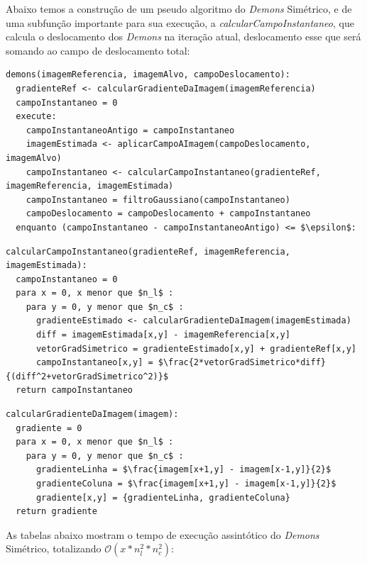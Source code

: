   Abaixo temos a construção de um pseudo algoritmo do \textit{Demons} Simétrico, e de uma subfunção importante para sua
execução, a \textit{calcularCampoInstantaneo}, que calcula o deslocamento dos \textit{Demons} na iteração atual,
deslocamento esse que será somando ao campo de deslocamento total:

\begin{lstlisting}[mathescape]
demons(imagemReferencia, imagemAlvo, campoDeslocamento):
  gradienteRef <- calcularGradienteDaImagem(imagemReferencia)
  campoInstantaneo = 0
  execute:
    campoInstantaneoAntigo = campoInstantaneo
    imagemEstimada <- aplicarCampoAImagem(campoDeslocamento, imagemAlvo)
    campoInstantaneo <- calcularCampoInstantaneo(gradienteRef, imagemReferencia, imagemEstimada)
    campoInstantaneo = filtroGaussiano(campoInstantaneo)
    campoDeslocamento = campoDeslocamento + campoInstantaneo
  enquanto (campoInstantaneo - campoInstantaneoAntigo) <= $\epsilon$:
\end{lstlisting}

\begin{lstlisting}[mathescape]
calcularCampoInstantaneo(gradienteRef, imagemReferencia, imagemEstimada):
  campoInstantaneo = 0
  para x = 0, x menor que $n_l$ :
    para y = 0, y menor que $n_c$ :
      gradienteEstimado <- calcularGradienteDaImagem(imagemEstimada)
      diff = imagemEstimada[x,y] - imagemReferencia[x,y]
      vetorGradSimetrico = gradienteEstimado[x,y] + gradienteRef[x,y]
      campoInstantaneo[x,y] = $\frac{2*vetorGradSimetrico*diff}{(diff^2+vetorGradSimetrico^2)}$
  return campoInstantaneo
\end{lstlisting}

\begin{lstlisting}[mathescape]
calcularGradienteDaImagem(imagem):
  gradiente = 0
  para x = 0, x menor que $n_l$ :
    para y = 0, y menor que $n_c$ :
      gradienteLinha = $\frac{imagem[x+1,y] - imagem[x-1,y]}{2}$
      gradienteColuna = $\frac{imagem[x+1,y] - imagem[x-1,y]}{2}$
      gradiente[x,y] = {gradienteLinha, gradienteColuna}
  return gradiente
\end{lstlisting}

  As tabelas abaixo mostram o tempo de execução assintótico do \textit{Demons} Simétrico, totalizando
$\mathcal{O}(x*n_l^2*n_c^2)$:

